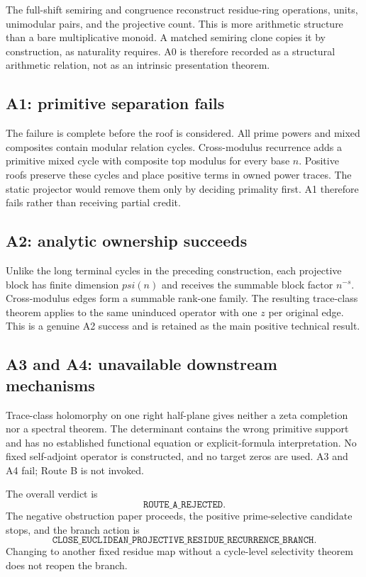The full-shift semiring and congruence reconstruct residue-ring operations,
units, unimodular pairs, and the projective count.  This is more arithmetic
structure than a bare multiplicative monoid.  A matched semiring clone copies
it by construction, as naturality requires.  A0 is therefore recorded as a
structural arithmetic relation, not as an intrinsic presentation theorem.

\subsection{A1: primitive separation fails}

The failure is complete before the roof is considered.  All prime powers and
mixed composites contain modular relation cycles.  Cross-modulus recurrence
adds a primitive mixed cycle with composite top modulus for every base $n$.
Positive roofs preserve these cycles and place positive terms in owned power
traces.  The static projector would remove them only by deciding primality
first.  A1 therefore fails rather than receiving partial credit.

\subsection{A2: analytic ownership succeeds}

Unlike the long terminal cycles in the preceding construction, each
projective block has finite dimension $psi(n)$ and receives the summable
block factor $n^{-s}$.  Cross-modulus edges form a summable rank-one family.
The resulting trace-class theorem applies to the same uninduced operator with
one $z$ per original edge.  This is a genuine A2 success and is retained as
the main positive technical result.

\subsection{A3 and A4: unavailable downstream mechanisms}

Trace-class holomorphy on one right half-plane gives neither a zeta completion
nor a spectral theorem.  The determinant contains the wrong primitive
support and has no established functional equation or explicit-formula
interpretation.  No fixed self-adjoint operator is constructed, and no target
zeros are used.  A3 and A4 fail; Route B is not invoked.

The overall verdict is
\[
 \boxed{\texttt{ROUTE\_A\_REJECTED}}.
\]
The negative obstruction paper proceeds, the positive prime-selective
candidate stops, and the branch action is
\[
 \boxed{\texttt{CLOSE\_EUCLIDEAN\_PROJECTIVE\_RESIDUE\_RECURRENCE\_BRANCH}}.
\]
Changing to another fixed residue map without a cycle-level selectivity
theorem does not reopen the branch.
